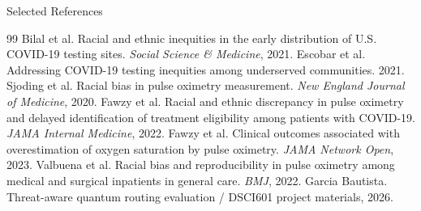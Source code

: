 \documentclass[aspectratio=169,10pt]{beamer}
\begin{document}
\begin{frame}[allowframebreaks]{Selected References}
\scriptsize
\begin{thebibliography}{99}
 Bilal et al. Racial and ethnic inequities in the early distribution of U.S. COVID-19 testing sites. \textit{Social Science \& Medicine}, 2021.
 Escobar et al. Addressing COVID-19 testing inequities among underserved communities. 2021.
 Sjoding et al. Racial bias in pulse oximetry measurement. \textit{New England Journal of Medicine}, 2020.
 Fawzy et al. Racial and ethnic discrepancy in pulse oximetry and delayed identification of treatment eligibility among patients with COVID-19. \textit{JAMA Internal Medicine}, 2022.
 Fawzy et al. Clinical outcomes associated with overestimation of oxygen saturation by pulse oximetry. \textit{JAMA Network Open}, 2023.
 Valbuena et al. Racial bias and reproducibility in pulse oximetry among medical and surgical inpatients in general care. \textit{BMJ}, 2022.
 Garcia Bautista. Threat-aware quantum routing evaluation / DSCI601 project materials, 2026.
\end{thebibliography}
\end{frame}
\end{document}
